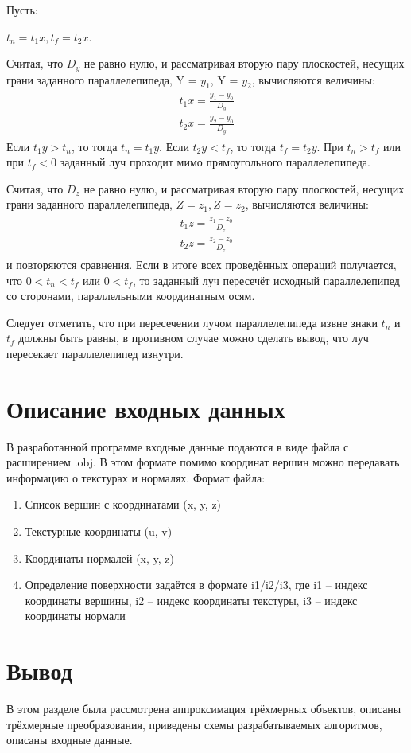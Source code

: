 Пусть: 


$t_n = t_1x, t_f = t_2x$. 


Считая, что $D_y$ не равно нулю, и рассматривая вторую пару плоскостей, несущих грани заданного параллелепипеда, Y = $y_1$, Y = $y_2$, вычисляются величины:
\begin{align}
	\begin{gathered}
		t_1x = \frac{y_1 - y_0}{D_y}\\
		t_2x = \frac{y_2 - y_0}{D_y}
	\end{gathered}
\end{align}
Если $t_1y > t_n$, то тогда $t_n = t_1y$. Если $t_2y < t_f$, то тогда $t_f = t_2y$. При $t_n > t_f$ или при $t_f < 0$ заданный луч проходит мимо прямоугольного параллелепипеда.


Считая, что $D_z$ не равно нулю, и рассматривая вторую пару плоскостей, несущих грани заданного параллелепипеда, $Z = z_1, Z = z_2$, вычисляются величины:
\begin{align}
	\begin{gathered}
		t_1z = \frac{z_1 - z_0}{D_z}\\
		t_2z = \frac{z_2 - z_0}{D_z}
	\end{gathered}
\end{align}
и повторяются сравнения.
Если в итоге всех проведённых операций получается, что $0 < t_n < t_f$ или $0 < t_f$, то заданный луч пересечёт исходный параллелепипед со сторонами, параллельными координатным осям.


Следует отметить, что при пересечении лучом параллелепипеда извне знаки $t_n$ и $t_f$ должны быть равны, в противном случае можно сделать вывод, что луч пересекает параллелепипед изнутри.
\section{Описание входных данных}
В разработанной программе входные данные подаются в виде файла с расширением .obj. В этом формате помимо координат вершин можно передавать информацию о текстурах и нормалях.
Формат файла:
\begin{enumerate}
\item Список вершин с координатами (x, y, z)
\item Текстурные координаты (u, v)
\item Координаты нормалей (x, y, z)
\item Определение поверхности задаётся в формате i1/i2/i3, где i1 – индекс координаты вершины, i2 – индекс координаты текстуры, i3 – индекс координаты нормали
\end{enumerate}
\section{Вывод}
В этом разделе была рассмотрена аппроксимация трёхмерных объектов, описаны трёхмерные преобразования, приведены схемы разрабатываемых алгоритмов, описаны входные данные.